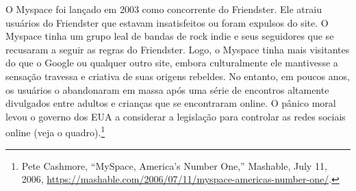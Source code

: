 O Myspace foi lançado em 2003 como concorrente do Friendster. Ele atraiu usuários do Friendster
que estavam insatisfeitos ou foram expulsos do site. O Myspace tinha um grupo leal de bandas de
rock indie e seus seguidores que se recusaram a seguir as regras do Friendster. Logo, o Myspace
tinha mais visitantes do que o Google ou qualquer outro site, embora culturalmente ele mantivesse
a sensação travessa e criativa de suas origens rebeldes. No entanto, em poucos anos, os usuários
o abandonaram em massa após uma série de encontros altamente divulgados entre adultos e crianças
que se encontraram online. O pânico moral levou o governo dos EUA a considerar a legislação para
controlar as redes sociais online (veja o quadro).\footnote{Pete Cashmore, ``MySpace, America’s
Number One,'' Mashable, July 11, 2006, \url{https://mashable.com/2006/07/11/myspace-americas-number-one/}.}


